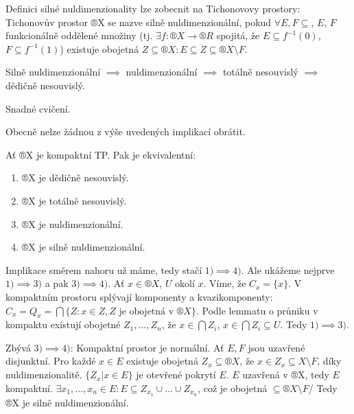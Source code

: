 \documentclass[12pt]{article}                   %
\begin{document}
    \begin{poznamka}
        Definici silné nuldimenzionality lze zobecnit na Tichonovovy prostory: Tichonovův prostor ®X se nazve silně nuldimenzionální, pokud $\forall E, F \subseteq$, $E$, $F$ funkcionálně oddělené množiny (tj. $\exists f: ®X \rightarrow ®R$ spojitá, že $E \subseteq f^{-1}(0)$, $F \subseteq f^{-1}(1)$) existuje obojetná $Z \subseteq ®X: E \subseteq Z \subseteq ®X \setminus F$.
    \end{poznamka}

    \begin{tvrzeni}
        Silně nuldimenzionální $\implies$ nuldimenzionální $\implies$ totálně nesouvislý $\implies$ dědičně nesouvislý.

        \begin{dukazin}
            Snadné cvičení.
        \end{dukazin}
    \end{tvrzeni}

    \begin{poznamka}
        Obecně nelze žádnou z výše uvedených implikací obrátit.
    \end{poznamka}

    \begin{veta}
        Ať ®X je kompaktní TP. Pak je ekvivalentní:

        \begin{enumerate}
            \item ®X je dědičně nesouvislý.
            \item ®X je totálně nesouvislý.
            \item ®X je nuldimenzionální.
            \item ®X je silně nuldimenzionální.
        \end{enumerate}

        \begin{dukazin}
            Implikace směrem nahoru už máme, tedy stačí $1) \implies 4)$. Ale ukážeme nejprve $1) \implies 3)$ a pak $3) \implies 4)$. Ať $x \in ®X$, $U$ okolí $x$. Víme, že $C_x = \{x\}$. V kompaktním prostoru splývají komponenty a kvazikomponenty: $C_x = Q_x = \bigcap \{Z: x \in Z, Z \text{ je obojetná v } ®X\}$. Podle lemmatu o průniku v kompaktu existují obojetné $Z_1, …, Z_n$, že $x \in \bigcap Z_i$, $x \in \bigcap Z_i \subseteq U$. Tedy $1) \implies 3)$.

            Zbývá $3) \implies 4)$: Kompaktní prostor je normální. Ať $E, F$ jsou uzavřené disjunktní. Pro každé $x \in E$ existuje obojetná $Z_x \subseteq ®X$, že $x \in Z_x \subseteq X \setminus F$, díky nuldimenzionalitě. $\{Z_x | x \in E\}$ je otevřené pokrytí $E$. $E$ uzavřená v ®X, tedy $E$ kompaktní. $\exists x_1, …, x_n \in E: E \subseteq Z_{x_1} \cup … \cup Z_{x_n}$, což je obojetná $\subseteq ®X \setminus F$/ Tedy ®X je silně nuldimenzionální.
        \end{dukazin}
    \end{veta}
\end{document}
